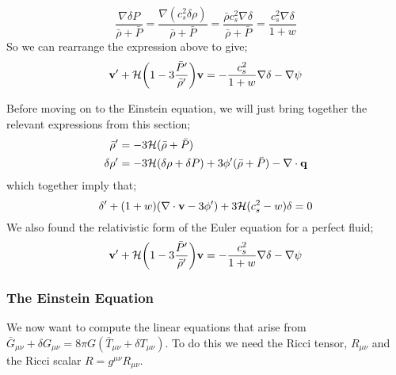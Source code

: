 \begin{equation*}
\frac{\nabla \delta P}{\bar{\rho} + \bar{P}} = \frac{\nabla(c_s^2 \delta \rho)}{\bar{\rho} + \bar{P}} = \frac{\bar{\rho}c_s^2 \nabla \delta}{\bar{\rho} + \bar{P}} = \frac{c_s^2 \nabla \delta}{1 + w}
\end{equation*}
So we can rearrange the expression above to give;
\begin{equation}
\vec{v}\pr + \hamilt\left(1 - 3\frac{\bar{P}\pr}{\bar{\rho}\pr}\right)\vec{v} = -\frac{c_s^2}{1 + w}\nabla \delta - \nabla \psi
\end{equation}
\begin{definitionbox}
Before moving on to the Einstein equation, we will just bring together the relevant expressions from this section;
\begin{align}
\bar{\rho}^{\prime} &= -3\mathcal{H} (\bar{\rho} + \bar{P}) \\
\delta \rho^{\prime} &= -3\mathcal{H}(\delta \rho + \delta P) + 3\phi^{\prime}(\bar{\rho} + \bar{P}) - \nabla\cdot\mathbf{q}
\end{align}
which together imply that;
\begin{equation}
\delta^{\prime} + (1 + w)(\nabla\cdot \mathbf{v} - 3\phi^{\prime}) + 3\mathcal{H}(c_s^2 - w)\delta = 0
\end{equation}
We also found the relativistic form of the Euler equation for a perfect fluid;
\begin{equation}
\vec{v}\pr + \hamilt\left(1 - 3\frac{\bar{P}\pr}{\bar{\rho}\pr}\right)\vec{v} = -\frac{c_s^2}{1 + w}\nabla \delta - \nabla \psi
\end{equation}
\end{definitionbox}
\subsubsection{The Einstein Equation}
We now want to compute the linear equations that arise from $\bar{G}_{\mu\nu} + \delta G_{\mu\nu} = 8\pi G(\bar{T}_{\mu\nu} + \delta T_{\mu\nu})$. To do this we need the Ricci tensor, $R_{\mu\nu}$ and the Ricci scalar $R = g^{\mu\nu}R_{\mu\nu}$.
